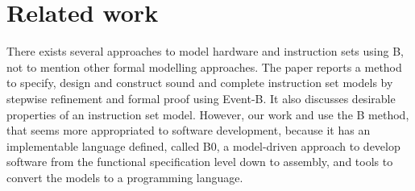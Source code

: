 \documentclass[a4paper]{llncs}
\begin{document}
%
%
%
%

\section{Related work}
\label{sec:relatedworks}

There exists several approaches to model hardware and instruction sets
using B, not to mention other formal modelling approaches.  The paper
\cite{springerlink:Yuan2011} reports a method to specify, design and
construct sound and complete instruction set models by stepwise
refinement and formal proof using Event-B. It also discusses desirable
properties of an instruction set model. However, our work
\cite{Valerio_SBMF09} and \cite{Subotic2010} use the B method, that
seems more appropriated to software development, because it has an
implementable language defined, called B0, a model-driven approach
\cite{Dantas_SBMF08} to develop software from the functional
specification level down to assembly, and tools to convert the models
to a programming language.
\end{document}
